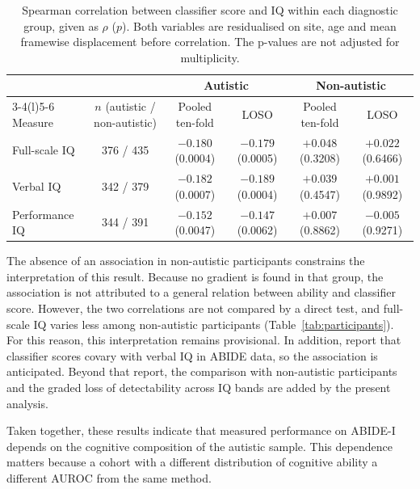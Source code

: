 \begin{table}[t]
\centering
\caption{Spearman correlation between classifier score and IQ within each diagnostic group,
given as $\rho$ ($p$). Both variables are residualised on site, age and mean framewise
displacement before correlation. The p-values are not adjusted for multiplicity.}
\label{tab:iq-correlations}
\small
\setlength{\tabcolsep}{4pt}
\begin{tabular}{@{}lccccc@{}}
\toprule
 & & \multicolumn{2}{c}{Autistic} & \multicolumn{2}{c}{Non-autistic} \\
\cmidrule(lr){3-4}\cmidrule(l){5-6}
Measure & $n$ (autistic / non-autistic) & Pooled ten-fold & LOSO & Pooled ten-fold & LOSO \\
\midrule
Full-scale IQ & 376 / 435 & $-0.180$ (0.0004) & $-0.179$ (0.0005) & $+0.048$ (0.3208) & $+0.022$ (0.6466) \\
Verbal IQ & 342 / 379 & $-0.182$ (0.0007) & $-0.189$ (0.0004) & $+0.039$ (0.4547) & $+0.001$ (0.9892) \\
Performance IQ & 344 / 391 & $-0.152$ (0.0047) & $-0.147$ (0.0062) & $+0.007$ (0.8862) & $-0.005$ (0.9271) \\
\bottomrule
\end{tabular}
\end{table}

The absence of an association in non-autistic participants constrains the interpretation of
this result. Because no gradient is found in that group, the association is not attributed
to a general relation between ability and classifier score. However, the two correlations
are not compared by a direct test, and full-scale IQ varies less among non-autistic
participants (Table~\ref{tab:participants}). For this reason, this interpretation remains
provisional. In addition, \citet{Nielsenetal2013} report that classifier scores covary with
verbal IQ in ABIDE data, so the association is anticipated. Beyond that report, the
comparison with non-autistic participants and the graded loss of detectability across IQ
bands are added by the present analysis.

Taken together, these results indicate that measured performance on ABIDE-I depends on the
cognitive composition of the autistic sample.  This dependence matters because
a cohort with a different distribution of cognitive ability  a different AUROC
from the same method.

